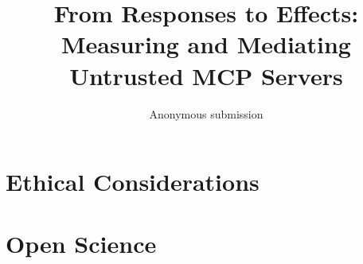 \documentclass[letterpaper,twocolumn,10pt]{article}
\date{}
\title{\Large \bf From Responses to Effects:\\
Measuring and Mediating Untrusted MCP Servers}
\author{\rm Anonymous submission}
\begin{document}
\maketitle



\appendix
\section*{Ethical Considerations}


\section*{Open Science}




\end{document}
